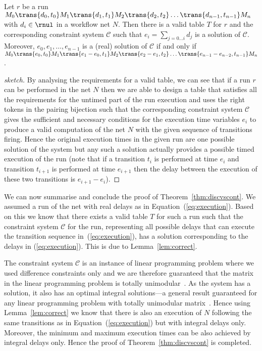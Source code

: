 \begin{lemma} \label{lem:correct}
Let $r$ be a run $M_0 \trans{d_0,t_0} M_1 \trans{d_1,t_1} M_2 \trans{d_2,t_2} 
\ldots \trans{d_{n-1},t_{n-1}} M_{n}$ with $d_i \in \rnul$ in a workflow
net $N$. Then there is a valid table $T$ for $r$
and the corresponding constraint system $\mathscr{C}$ such that
$e_i= \sum_{j=0 \ldots i} d_j$ is a solution of $\mathscr{C}$. 
Moreover, $e_0, e_1, \ldots, e_{n-1}$ is a (real) solution of 
$\mathscr{C}$ if and only if
$M_0 \trans{e_0,t_0} M_1 \trans{e_1-e_0,t_1} M_2 \trans{e_2-e_1,t_2} 
\ldots \trans{e_{n-1}-e_{n-2},t_{n-1}} M_{n}$.
\end{lemma}
\begin{proof}[sketch]
By analysing the requirements for a valid table, we can see that if
a run $r$ can be performed in the net $N$ then we are able to 
design a table that satisfies all the requirements for the untimed
part of the run execution and uses the right tokens in the pairing
bijection such that the corresponding constraint system $\mathscr{C}$
gives the sufficient and necessary
conditions for the execution time variables $e_i$ to produce a valid
computation of the net $N$ with the given sequence of transitions firing. 
Hence the original execution times in the given run are one possible solution of 
the system but any such a solution actually provides a possible
timed execution of the run (note that if a transition $t_i$ is performed 
at time $e_i$ and transition $t_{i+1}$ is performed at time $e_{i+1}$ then
the delay between the execution of these two transitions is $e_{i+1}-e_{i}$).
\end{proof}

We can now summarise and conclude the proof of Theorem~\ref{thm:discvscont}. 
We assumed a run of the net with real delays as in Equation~(\ref{eq:execution}).
Based on this we know that there exists a valid table $T$ for such a run such that 
the constraint system $\mathscr{C}$ for the run, representing all possible 
delays that can execute the transition sequence in~(\ref{eq:execution}), has
a solution corresponding to the delays in (\ref{eq:execution}). This is due
to Lemma~\ref{lem:correct}. 

The constraint system $\mathscr{C}$ is an instance of linear programming 
problem where we used difference constraints only and we are therefore 
guaranteed that the matrix in the linear programming problem is totally
unimodular~\cite{umodmatrix1}. As the system has a solution, it also
has an optimal integral solutions---a general result guaranteed
for any linear programming problem with totally unimodular 
matrix~\cite{umodmatrix2}.
Hence using Lemma~\ref{lem:correct} we know that there is also an execution
of $N$ following the same transitions as in Equation~(\ref{eq:execution})
but with integral delays only. Moreover, the minimum and maximum
execution times can be also achieved by integral delays only. Hence
the proof of Theorem~\ref{thm:discvscont} is completed.


